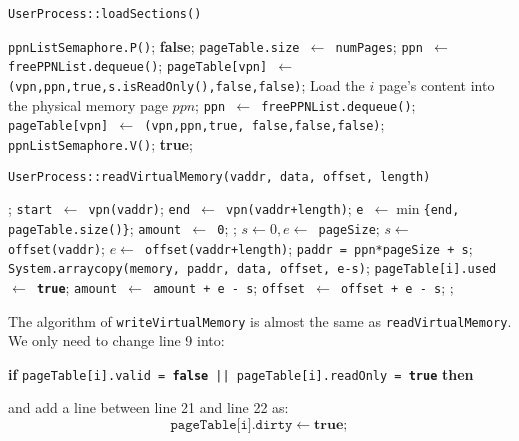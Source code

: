 \documentclass{article}
\begin{document}
\begin{spacing}{1.1}
\begin{algorithm}[htbp]
  \caption{\texttt{UserProcess::loadSections()}}
  \begin{algorithmic}[1]
    \STATE \texttt{ppnListSemaphore.P()};
    \RETURN \textbf{false};
    \ENDIF
    \STATE \texttt{pageTable.size $\gets$ numPages};
    \STATE \texttt{ppn $\gets$ freePPNList.dequeue()};
    \STATE \texttt{pageTable[vpn] $\gets$ (vpn,ppn,true,s.isReadOnly(),false,false)};
    \STATE Load the $i$ page's content into the physical memory page $ppn$;
    \ENDFOR
    \STATE \texttt{ppn $\gets$ freePPNList.dequeue()};
    \STATE \texttt{pageTable[vpn] $\gets$ (vpn,ppn,true, false,false,false)};
    \ENDFOR
    \STATE \texttt{ppnListSemaphore.V()};
    \RETURN \textbf{true};
  \end{algorithmic}
\end{algorithm}

\begin{algorithm}[htbp]
  \caption{\texttt{UserProcess::readVirtualMemory(vaddr, data, offset, length)}}
  \begin{algorithmic}[1]
    ;
    \ENDIF
    \STATE \texttt{start $\gets$  vpn(vaddr)};
    \STATE \texttt{end $\gets$  vpn(vaddr+length)};
    \STATE \texttt{e $\gets \min$\{end, pageTable.size()\}};
    \STATE \texttt{amount $\gets$  0};
    ;
    \ENDIF
    \STATE \texttt{$s \gets 0, e \gets$ pageSize};
    \STATE \texttt{$s \gets$  offset(vaddr)};
    \ENDIF
    \STATE \texttt{$e \gets$  offset(vaddr+length)};
    \ENDIF
    \STATE \texttt{paddr = ppn*pageSize + s};
    \STATE \texttt{System.arraycopy(memory, paddr, data, offset, e-s)};
    \STATE \texttt{pageTable[i].used $\gets$  \textbf{true}};
    \STATE \texttt{amount  $\gets$  amount + e - s};
    \STATE \texttt{offset  $\gets$  offset + e - s};
    \ENDFOR
    ;
  \end{algorithmic}
\end{algorithm} 
The algorithm of \texttt{writeVirtualMemory} is almost the same as 
\texttt{readVirtualMemory}.
We only need to change line 9 into: \\
\begin{center}
  \textbf{if} \texttt{pageTable[i].valid = \textbf{false} || pageTable[i].readOnly = 
  \textbf{true}} \textbf{then}
\end{center}
and add a line between line 21 and line 22 as: 
\[ \texttt{pageTable[i].dirty}  \gets  \textbf{true}; \]


\end{spacing}
\end{document}
